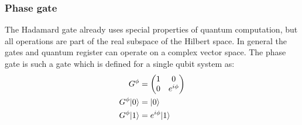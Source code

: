 \documentclass[bibliography=totocnumbered]{article}
\theoremstyle{NoticeStyle}
\begin{document}
\subsubsection{Phase gate}
The Hadamard gate already uses special properties of quantum computation, but all operations are part of the real subspace of the Hilbert space. In general the gates and quantum register can operate on a complex vector space. The phase gate is such a gate which is defined for a single qubit system as:
%
\begin{align}
	G^\phi & = 
			\begin{pmatrix}
				1 & 0\\
				0 & e^{i\phi}
			\end{pmatrix}\\
	G^\phi {\left\vert{0}\right\rangle} & = {\left\vert{0}\right\rangle}\\
	G^\phi {\left\vert{1}\right\rangle} & = e^{i\phi} {\left\vert{1}\right\rangle}
\end{align}
%
\end{document}

